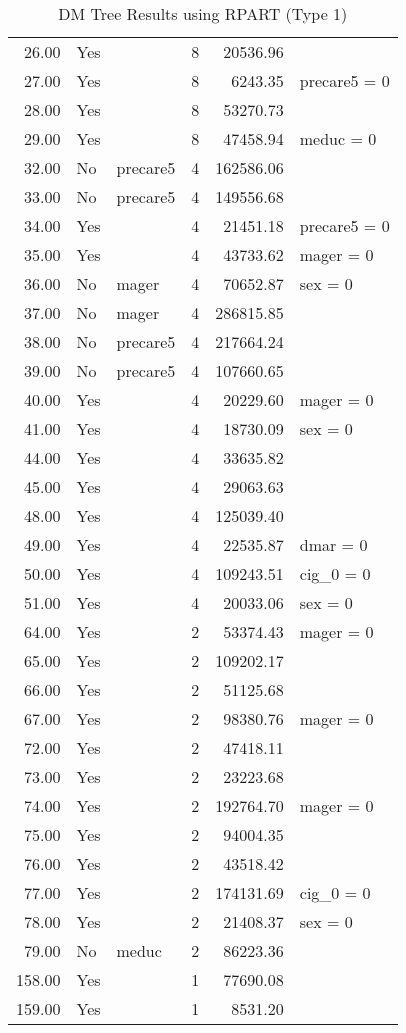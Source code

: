 \begin{landscape}
\begin{table}[htbp]
\begin{tabular}{rllrrl}
  26.00 & Yes &  &   8 & 20536.96 &  \\ 
  27.00 & Yes &  &   8 & 6243.35 & precare5 = 0 \\ 
  28.00 & Yes &  &   8 & 53270.73 &  \\ 
  29.00 & Yes &  &   8 & 47458.94 & meduc = 0 \\ 
  32.00 & No & precare5 &   4 & 162586.06 &  \\ 
  33.00 & No & precare5 &   4 & 149556.68 &  \\ 
  34.00 & Yes &  &   4 & 21451.18 & precare5 = 0 \\ 
  35.00 & Yes &  &   4 & 43733.62 & mager = 0 \\ 
  36.00 & No & mager &   4 & 70652.87 & sex = 0 \\ 
  37.00 & No & mager &   4 & 286815.85 &  \\ 
  38.00 & No & precare5 &   4 & 217664.24 &  \\ 
  39.00 & No & precare5 &   4 & 107660.65 &  \\ 
  40.00 & Yes &  &   4 & 20229.60 & mager = 0 \\ 
  41.00 & Yes &  &   4 & 18730.09 & sex = 0 \\ 
  44.00 & Yes &  &   4 & 33635.82 &  \\ 
  45.00 & Yes &  &   4 & 29063.63 &  \\ 
  48.00 & Yes &  &   4 & 125039.40 &  \\ 
  49.00 & Yes &  &   4 & 22535.87 & dmar = 0 \\ 
  50.00 & Yes &  &   4 & 109243.51 & cig_0 = 0 \\ 
  51.00 & Yes &  &   4 & 20033.06 & sex = 0 \\ 
  64.00 & Yes &  &   2 & 53374.43 & mager = 0 \\ 
  65.00 & Yes &  &   2 & 109202.17 &  \\ 
  66.00 & Yes &  &   2 & 51125.68 &  \\ 
  67.00 & Yes &  &   2 & 98380.76 & mager = 0 \\ 
  72.00 & Yes &  &   2 & 47418.11 &  \\ 
  73.00 & Yes &  &   2 & 23223.68 &  \\ 
  74.00 & Yes &  &   2 & 192764.70 & mager = 0 \\ 
  75.00 & Yes &  &   2 & 94004.35 &  \\ 
  76.00 & Yes &  &   2 & 43518.42 &  \\ 
  77.00 & Yes &  &   2 & 174131.69 & cig_0 = 0 \\ 
  78.00 & Yes &  &   2 & 21408.37 & sex = 0 \\ 
  79.00 & No & meduc &   2 & 86223.36 &  \\ 
  158.00 & Yes &  &   1 & 77690.08 &  \\ 
  159.00 & Yes &  &   1 & 8531.20 &  \\ 
   \hline
\end{tabular}
\endgroup
\caption{DM Tree Results using RPART (Type 1)} 
\label{tab:rpart_results_type1}
\end{table}
\end{landscape}
